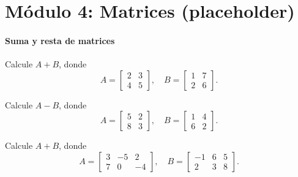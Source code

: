 
\section*{Módulo 4: Matrices (placeholder)}

\paragraph{Suma y resta de matrices}

\begin{ejercicio}
Calcule $A+B$, donde
\[
A=\begin{bmatrix} 2 & 3 \\ 4 & 5 \end{bmatrix}, \quad
B=\begin{bmatrix} 1 & 7 \\ 2 & 6 \end{bmatrix}.
\]
\end{ejercicio}
\muestraSolucion{
\[
A+B=\begin{bmatrix} 2+1 & 3+7 \\ 4+2 & 5+6 \end{bmatrix}=
\begin{bmatrix} 3 & 10 \\ 6 & 11 \end{bmatrix}.
\]
}

\begin{ejercicio}
Calcule $A-B$, donde
\[
A=\begin{bmatrix} 5 & 2 \\ 8 & 3 \end{bmatrix}, \quad
B=\begin{bmatrix} 1 & 4 \\ 6 & 2 \end{bmatrix}.
\]
\end{ejercicio}
\muestraSolucion{
\[
A-B=\begin{bmatrix} 5-1 & 2-4 \\ 8-6 & 3-2 \end{bmatrix}=
\begin{bmatrix} 4 & -2 \\ 2 & 1 \end{bmatrix}.
\]
}

\begin{ejercicio}
Calcule $A+B$, donde
\[
A=\begin{bmatrix} 3 & -5 & 2 \\ 7 & 0 & -4 \end{bmatrix}, \quad
B=\begin{bmatrix} -1 & 6 & 5 \\ 2 & 3 & 8 \end{bmatrix}.
\]
\end{ejercicio}
\muestraSolucion{
\[
A+B=\begin{bmatrix} 2 & 1 & 7 \\ 9 & 3 & 4 \end{bmatrix}.
\]
}

